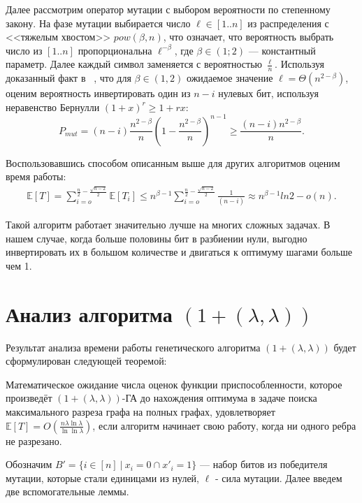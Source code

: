 \documentclass[times]{itmo-student-thesis}
\newcommand{\alglambda}{${(1 + (\lambda , \lambda))}$\xspace}
\newcommand{\ollga}{${(1 + (\lambda , \lambda))}$-ГА\xspace}
\begin{document}
Далее рассмотрим оператор мутации с выбором вероятности по степенному закону. На фазе мутации выбирается число $\ell \in [1..n]$ из распределения с <<тяжелым хвостом>> $pow(\beta, n)$, что означает, что  вероятность выбрать число из $[1..n]$ пропорциональна $\ell^{-\beta}$, где $\beta \in (1; 2)$ --- константный параметр.
Далее каждый символ заменяется с вероятностью $\frac{\ell}{n}$.
Используя доказанный факт в ~\cite{ссылка}, что для $\beta \in (1, 2)$  ожидаемое значение $\ell = \Theta(n^{2-\beta})$, оценим вероятность инвертировать один из $n-i$ нулевых бит, используя неравенство Бернулли $(1 + x)^r \ge 1 + rx$:
$$
  P_{mut} = (n-i)\frac{n^{2-\beta}}{n}\left(1 - \frac{n^{2-\beta}}{n}\right)^{n-1} \ge \frac{(n-i)n^{2-\beta}}{n}.
$$

Воспользовавшись способом описанным выше для других алгоритмов оценим время работы:
\begin{align*}
\mathbb{E}[T] = \sum_{i=o}^{\frac{n}{2} - \frac{\sqrt{n-2}}{2}} \mathbb{E}[T_i]
  \leq n^{\beta-1} \sum_{i=o}^{\frac{n}{2} - \frac{\sqrt{n-2}}{2}} \frac{1}{(n-i)}
  \approx n^{\beta-1} ln2 - o(n).
\end{align*}

Такой алгоритм работает значительно лучше на многих сложных задачах.
В нашем случае, когда больше половины бит в разбиении нули, выгодно инвертировать их в большом количестве и двигаться к оптимуму шагами больше чем 1.

\section{Анализ алгоритма \alglambda}
Результат анализа времени работы генетического алгоритма \alglambda будет сформулирован следующей теоремой:

\begin{theorem} \label{thm:time}
    Математическое ожидание числа оценок функции приспособленности, которое произведёт \ollga до нахождения оптимума в задаче поиска максимального разреза графа на полных графах, удовлетворяет $\mathbb{E}[T]=O(\frac{n\lambda \ln \lambda}{\ln \ln \lambda})$, если алгоритм начинает свою работу, когда ни одного ребра не разрезано.
\end{theorem}

Обозначим $B' = \{i \in [n] ~|~ x_i = 0 \cap x'_i = 1\}$ --- набор битов из победителя мутации, которые стали единицами из нулей,
$\ell$ - сила мутации. Далее введем две вспомогательные леммы.
\end{document}
